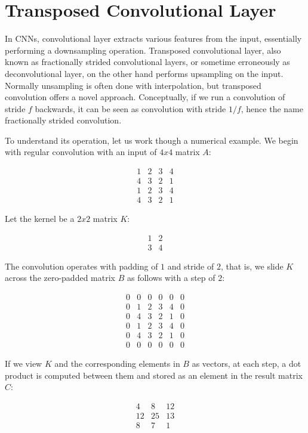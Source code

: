 
\chapter{Transposed Convolutional Layer}

In CNNs, convolutional layer extracts various features from the input, essentially performing a downsampling
operation. Transposed convolutional layer, also known as fractionally strided convolutional layers, or sometime
erroneously as deconvolutional layer, on the other hand performs upsampling on the input. Normally unsampling
is often done with interpolation, but transposed convolution offers a novel approach. Conceptually,
if we run a convolution of stride $f$ backwards, it can be seen as convolution with stride $1/f$, hence the
name fractionally strided convolution.

To understand its operation, let us work though a numerical example. We begin with regular convolution
with an input of $4x4$ matrix $A$:

$$
\begin{matrix}
1 & 2 & 3 & 4 \\
4 & 3 & 2 & 1 \\
1 & 2 & 3 & 4 \\
4 & 3 & 2 & 1
\end{matrix}
$$

Let the kernel be a $2x2$ matrix $K$:

$$
\begin{matrix}
1 & 2 \\
3 & 4
\end{matrix}
$$

The convolution operates with padding of $1$ and stride of $2$, that is, we slide $K$ across the zero-padded
matrix $B$ as follows with a step of $2$:

$$
\begin{matrix}
0 & 0 & 0 & 0 & 0 & 0 \\
0 & 1 & 2 & 3 & 4 & 0 \\
0 & 4 & 3 & 2 & 1 & 0 \\
0 & 1 & 2 & 3 & 4 & 0 \\
0 & 4 & 3 & 2 & 1 & 0 \\
0 & 0 & 0 & 0 & 0 & 0
\end{matrix}
$$

If we view $K$ and the corresponding elements in $B$ as vectors, at each step, a dot product is computed
between them and stored as an element in the result matrix $C$:

$$
\begin{matrix}
4 & 8 & 12 \\
12 & 25 & 13 \\
8 & 7 & 1
\end{matrix}
$$

\clearpage %
